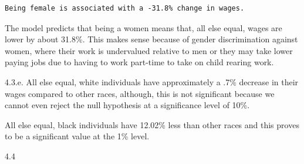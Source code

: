 \documentclass[
  11pt,
  letterpaper,
  DIV=11,
  numbers=noendperiod]{scrartcl}
\begin{document}
\begin{verbatim}
Being female is associated with a -31.8% change in wages.
\end{verbatim}

The model predicts that being a women means that, all else equal, wages
are lower by about 31.8\%. This makes sense because of gender
discrimination against women, where their work is undervalued relative
to men or they may take lower paying jobs due to having to work
part-time to take on child rearing work.

4.3.e. All else equal, white individuals have approximately a .7\%
decrease in their wages compared to other races, although, this is not
significant because we cannot even reject the null hypothesis at a
significance level of 10\%.

All else equal, black individuals have 12.02\% less than other races and
this proves to be a significant value at the 1\% level.

4.4
\end{document}
